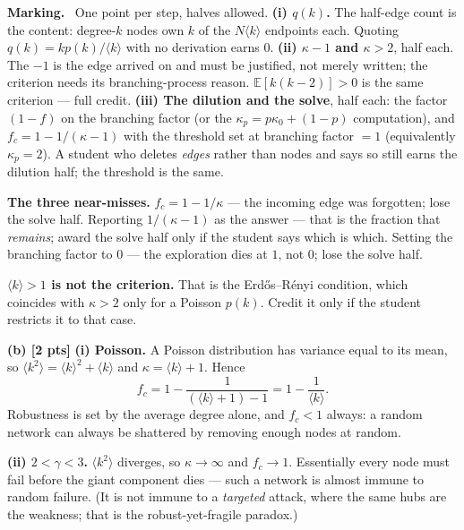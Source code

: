 \documentclass[a4paper, 11pt]{extarticle}
\newenvironment{grading}
  {\begin{tcolorbox}[colback=pltblue!4, colframe=pltblue!35, boxrule=0.5pt,
                     sharp corners, boxsep=2pt, left=6pt, right=6pt,
                     top=4pt, bottom=4pt]\footnotesize\textbf{Marking.}\ }
  {\end{tcolorbox}}
\begin{document}
\begin{grading}
One point per step, halves allowed.
\textbf{(i) $q(k)$.} The half-edge count is the content: degree-$k$ nodes own
$k$ of the $N\langle k \rangle$ endpoints each. Quoting
$q(k) = k p(k)/\langle k \rangle$ with no derivation earns 0.
\textbf{(ii) $\kappa - 1$ and $\kappa > 2$}, half each. The $-1$ is the edge
arrived on and must be justified, not merely written; the criterion needs its
branching-process reason. $\mathbb{E}[k(k-2)] > 0$ is the same criterion ---
full credit.
\textbf{(iii) The dilution and the solve}, half each: the factor $(1-f)$ on
the branching factor (or the $\kappa_p = p\kappa_0 + (1-p)$ computation), and
$f_c = 1 - 1/(\kappa - 1)$ with the threshold set at branching factor $= 1$
(equivalently $\kappa_p = 2$). A student who deletes \emph{edges} rather than
nodes and says so still earns the dilution half; the threshold is the same.

\textbf{The three near-misses.}
$f_c = 1 - 1/\kappa$ --- the incoming edge was forgotten; lose the solve half.
Reporting $1/(\kappa-1)$ as the answer --- that is the fraction that
\emph{remains}; award the solve half only if the student says which is which.
Setting the branching factor to $0$ --- the exploration dies at $1$, not $0$;
lose the solve half.

\textbf{$\langle k \rangle > 1$ is not the criterion.} That is the
Erd\H{o}s--R\'enyi condition, which coincides with $\kappa > 2$ only for a
Poisson $p(k)$. Credit it only if the student restricts it to that case.
\end{grading}

\textbf{(b) [2 pts]}
\textbf{(i) Poisson.} A Poisson distribution has variance equal to its mean,
so $\langle k^2 \rangle = \langle k \rangle^2 + \langle k \rangle$ and
$\kappa = \langle k \rangle + 1$. Hence
\[
  f_c = 1 - \frac{1}{(\langle k \rangle + 1) - 1}
      = 1 - \frac{1}{\langle k \rangle} .
\]
Robustness is set by the average degree alone, and $f_c < 1$ always: a random
network can always be shattered by removing enough nodes at random.

\textbf{(ii) $2 < \gamma < 3$.} $\langle k^2 \rangle$ diverges, so
$\kappa \to \infty$ and $f_c \to 1$. Essentially every node must fail before
the giant component dies --- such a network is almost immune to random
failure. (It is not immune to a \emph{targeted} attack, where the same hubs
are the weakness; that is the robust-yet-fragile paradox.)
\end{document}
